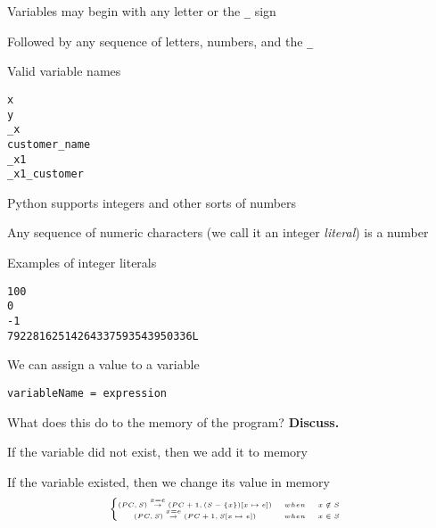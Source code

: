 \documentclass{beamer}
\begin{document}
\begin{slide}{
\item Variables may begin with any letter or the \texttt{\_} sign
\item Followed by any sequence of letters, numbers, and the \texttt{\_}
}\end{slide}

\begin{frame}[fragile]{Valid variable names}
\begin{lstlisting}
x
y
_x
customer_name
_x1
_x1_customer
\end{lstlisting}
\end{frame}

\begin{slide}{
\item Python supports integers and other sorts of numbers
\item Any sequence of numeric characters (we call it an integer \textit{literal}) is a number
}\end{slide}

\begin{frame}[fragile]{Examples of integer literals}
\begin{lstlisting}
100
0
-1
79228162514264337593543950336L
\end{lstlisting}
\end{frame}

\begin{slide}{
\item We can assign a value to a variable
\item \texttt{variableName = expression}
\item What does this do to the memory of the program? \textbf{Discuss.}
\pause
\item If the variable did not exist, then we add it to memory
\item If the variable existed, then we change its value in memory 
$$
\tiny
\left\{
\begin{matrix}
(PC,S) \overset{x = e}{\rightarrow} (PC+1,(S - \{x\})[x \mapsto e]) &when& x \notin S & \\
(PC,S) \overset{x = e}{\rightarrow} (PC+1,S[x \mapsto e]) &when& x \in S& \\
\end{matrix}
\right.
$$
}\end{slide}

\end{document}
